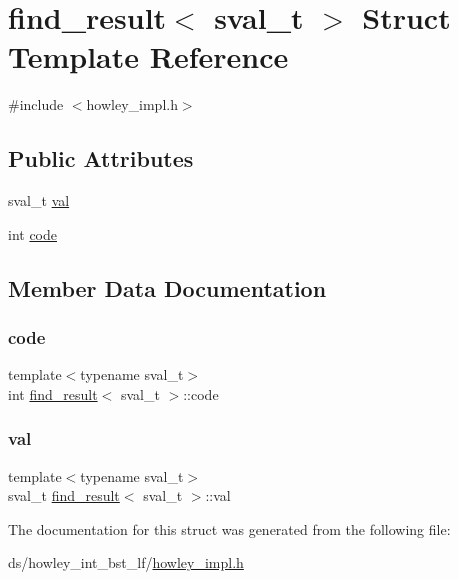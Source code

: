 \hypertarget{structfind__result}{}\section{find\+\_\+result$<$ sval\+\_\+t $>$ Struct Template Reference}
\label{structfind__result}


{\ttfamily \#include $<$howley\+\_\+impl.\+h$>$}

\subsection*{Public Attributes}
\begin{DoxyCompactItemize}
\item 
sval\+\_\+t \hyperlink{structfind__result_ad5b8d2f3ac882b64b0de838d4bd57df6}{val}
\item 
int \hyperlink{structfind__result_aff1a6d4a2a56520590224d4feeef0577}{code}
\end{DoxyCompactItemize}


\subsection{Member Data Documentation}
\mbox{\label{structfind__result_aff1a6d4a2a56520590224d4feeef0577}} 
\subsubsection{\texorpdfstring{code}{code}}
{\footnotesize\ttfamily template$<$typename sval\+\_\+t$>$ \\
int \hyperlink{structfind__result}{find\+\_\+result}$<$ sval\+\_\+t $>$\+::code}

\mbox{\label{structfind__result_ad5b8d2f3ac882b64b0de838d4bd57df6}} 
\subsubsection{\texorpdfstring{val}{val}}
{\footnotesize\ttfamily template$<$typename sval\+\_\+t$>$ \\
sval\+\_\+t \hyperlink{structfind__result}{find\+\_\+result}$<$ sval\+\_\+t $>$\+::val}



The documentation for this struct was generated from the following file\+:\begin{DoxyCompactItemize}
\item 
ds/howley\+\_\+int\+\_\+bst\+\_\+lf/\hyperlink{howley__impl_8h}{howley\+\_\+impl.\+h}\end{DoxyCompactItemize}
